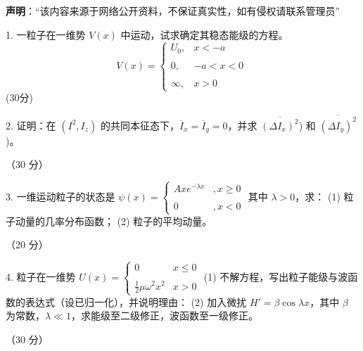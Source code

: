 
\textbf{声明}：“该内容来源于网络公开资料，不保证真实性，如有侵权请联系管理员”

1. 一粒子在一维势 \( V(x) \) 中运动，试求确定其稳态能级的方程。
$$V(x) = \begin{cases} U_0, & x < -a \\\\0, & -a < x < 0 \\\\\infty, & x > 0 \end{cases}~$$
(30分)

2. 证明：在 $\left( I^2, I_z \right)$ 的共同本征态下，$\overline{I}_x = \overline{I}_y = 0$，并求 $\overline{\left( \Delta I_x \right)^2}$) 和 $\overline{\left( \Delta I_y \right)^2}$)。

（30 分）

3. 一维运动粒子的状态是 $\psi(x) = \begin{cases} Axe^{-\lambda x} &, x \geq 0 \\\\0 & ,x < 0\end{cases}$
其中 $\lambda > 0$，求：
(1) 粒子动量的几率分布函数；
(2) 粒子的平均动量。

（20 分）

4. 粒子在一维势 $U(x) = \begin{cases} 0 & x \leq 0 \\\\ \frac{1}{2}\mu \omega^2 x^2 & x > 0 \end{cases}$
(1) 不解方程，写出粒子能级与波函数的表达式（设已归一化），并说明理由：
(2) 加入微扰 $H' = \beta \cos \lambda x$，其中 $\beta$ 为常数，$\lambda \ll 1$，求能级至二级修正，波函数至一级修正。

（30 分）
